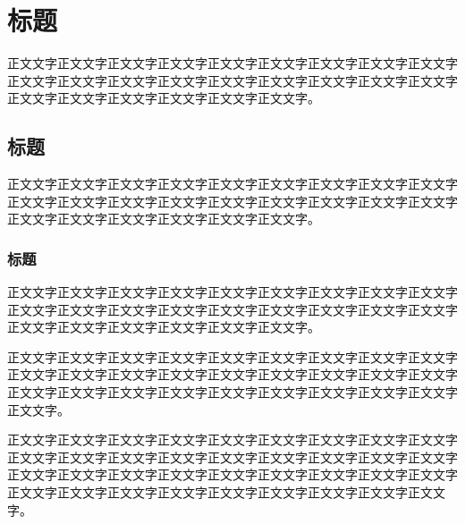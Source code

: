 

\chapter{标题}

正文文字正文文字正文文字正文文字正文文字正文文字正文文字正文文字正文文字正文文字正文文字正文文字正文文字正文文字正文文字正文文字正文文字正文文字正文文字正文文字正文文字正文文字正文文字正文文字。

\section{标题}

正文文字正文文字正文文字正文文字正文文字正文文字正文文字正文文字正文文字正文文字正文文字正文文字正文文字正文文字正文文字正文文字正文文字正文文字正文文字正文文字正文文字正文文字正文文字正文文字。

\subsection{标题}

正文文字正文文字正文文字正文文字正文文字正文文字正文文字正文文字正文文字正文文字正文文字正文文字正文文字正文文字正文文字正文文字正文文字正文文字正文文字正文文字正文文字正文文字正文文字正文文字。

正文文字正文文字正文文字正文文字正文文字正文文字正文文字正文文字正文文字正文文字正文文字正文文字正文文字正文文字正文文字正文文字正文文字正文文字正文文字正文文字正文文字正文文字正文文字正文文字正文文字正文文字正文文字正文文字。

正文文字正文文字正文文字正文文字正文文字正文文字正文文字正文文字正文文字正文文字正文文字正文文字正文文字正文文字正文文字正文文字正文文字正文文字正文文字正文文字正文文字正文文字正文文字正文文字正文文字正文文字正文文字正文文字正文文字正文文字正文文字正文文字正文文字正文文字正文文字正文文字。

